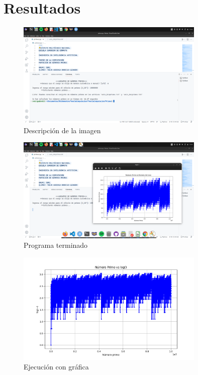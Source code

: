 \documentclass[11pt]{article} %
\begin{document}
	\section{Resultados}
	\begin{figure}[H]
		\centering
		\includegraphics[width=0.8\textwidth]{imagen1.png}
		\caption{Descripción de la imagen}

	\end{figure}
	
	\begin{figure}[H]
		\centering
		\includegraphics[width=0.8\textwidth]{imagen2.png}
		\caption{Programa terminado}
	\end{figure}
	
	\begin{figure}[H]
		\centering
		\includegraphics[width=0.8\textwidth]{imagen3.png}
		\caption{Ejecución con gráfica}
	\end{figure}
	
\end{document}

